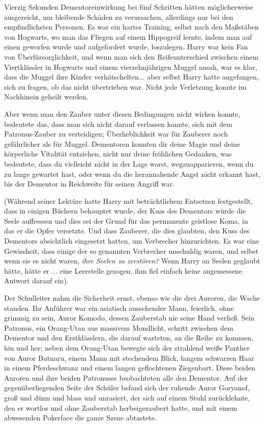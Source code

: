 Vierzig Sekunden Dementoreinwirkung bei fünf Schritten hätten möglicherweise
ausgereicht, um bleibende Schäden zu verursachen, allerdings nur bei den
empfindlichsten Personen. Es war ein hartes Training, selbst nach den Maßstäben
von Hogwarts, wo man das Fliegen auf einem Hippogreif lernte, indem man auf
einen geworfen wurde und aufgefordert wurde, loszulegen. Harry war kein Fan von
Überfürsorglichkeit, und wenn man sich den Reifeunterschied zwischen einem
Viertklässler in Hogwarts und einem vierzehnjährigen Muggel ansah, war es klar,
dass die Muggel ihre Kinder verhätschelten... aber selbst Harry hatte
angefangen, sich zu fragen, ob das nicht übertrieben war. Nicht jede Verletzung
konnte im Nachhinein geheilt werden.

Aber wenn man den Zauber unter diesen Bedingungen nicht wirken konnte, bedeutete
das, dass man sich nicht darauf verlassen konnte, sich mit dem Patronus-Zauber
zu verteidigen; Überheblichkeit war für Zauberer noch gefährlicher als für
Muggel. Dementoren konnten dir deine Magie und deine körperliche Vitalität
entziehen, nicht nur deine fröhlichen Gedanken, was bedeutete, dass du
vielleicht nicht in der Lage warst, wegzuapparieren, wenn du zu lange gewartet
hast, oder wenn du die herannahende Angst nicht erkannt hast, bis der Dementor
in Reichweite für seinen Angriff war.

(Während seiner Lektüre hatte Harry mit beträchtlichem Entsetzen festgestellt,
dass in einigen Büchern behauptet wurde, der Kuss des Dementors würde die Seele
auffressen und dies sei der Grund für das permanente geistlose Koma, in das er
die Opfer versetzte. Und dass Zauberer, die dies glaubten, den Kuss des
Dementors absichtlich eingesetzt hatten, um Verbrecher hinzurichten. Es war eine
Gewissheit, dass einige der so genannten Verbrecher unschuldig waren, und selbst
wenn sie es nicht waren,\emph{ ihre Seelen zu zerstören? }Wenn Harry an Seelen
geglaubt hätte, hätte er ... eine Leerstelle gezogen, ihm fiel einfach keine
angemessene Antwort darauf ein).

Der Schulleiter nahm die Sicherheit ernst, ebenso wie die drei Auroren, die
Wache standen. Ihr Anführer war ein asiatisch aussehender Mann, feierlich, ohne
grimmig zu sein, Auror Komodo, dessen Zauberstab nie seine Hand verließ. Sein
Patronus, ein Orang-Utan aus massivem Mondlicht, schritt zwischen dem Dementor
und den Erstklässlern, die darauf warteten, an die Reihe zu kommen, hin und her;
neben dem Orang-Utan bewegte sich der strahlend weiße Panther von Auror Butnaru,
einem Mann mit stechendem Blick, langem schwarzen Haar in einem Pferdeschwanz
und einem langen geflochtenen Ziegenbart. Diese beiden Auroren und ihre beiden
Patronusse beobachteten alle den Dementor. Auf der gegenüberliegenden Seite der
Schüler befand sich der ruhende Auror Goryanof, groß und dünn und blass und
unrasiert, der sich auf einem Stuhl zurücklehnte, den er wortlos und ohne
Zauberstab herbeigezaubert hatte, und mit einem abwesenden Pokerface die ganze
Szene abtastete.

